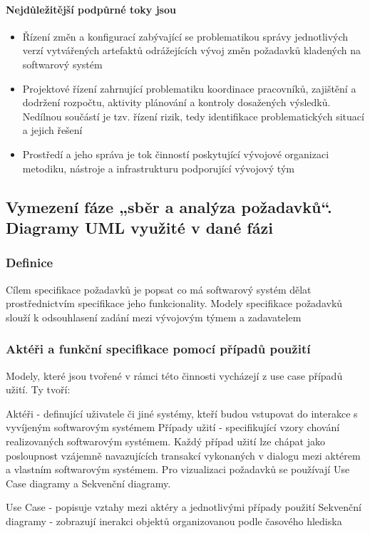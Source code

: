 \documentclass[10pt,a4paper]{article}
\begin{document}
\paragraph{Nejdůležitější podpůrné toky jsou}

\begin{itemize}
\item Řízení změn a konfigurací zabývající se problematikou správy jednotlivých verzí vytvářených artefaktů odrážejících vývoj změn požadavků kladených na softwarový systém
\item Projektové řízení zahrnující problematiku koordinace pracovníků, zajištění a dodržení rozpočtu, aktivity plánování a kontroly dosažených výsledků. Nedílnou součástí je tzv. řízení rizik, tedy identifikace problematických situací a jejich řešení
\item Prostředí a jeho správa je tok činností poskytující vývojové organizaci metodiku, nástroje a infrastrukturu podporující vývojový tým
\end{itemize}

\subsection{Vymezení fáze „sběr a analýza požadavků“. Diagramy UML využité v dané fázi}
\subsubsection{Definice}
Cílem specifikace požadavků je popsat co má softwarový systém dělat prostřednictvím specifikace jeho funkcionality. Modely specifikace požadavků slouží k odsouhlasení zadání mezi vývojovým týmem a zadavatelem
\subsubsection{Aktéři a funkční specifikace pomocí případů použití}
Modely, které jsou tvořené v rámci této činnosti vycházejí z use case případů užití. Ty tvoří:

Aktéři - definující uživatele či jiné systémy, kteří budou vstupovat do interakce s vyvíjeným softwarovým systémem
Případy užití - specifikující vzory chování realizovaných softwarovým systémem. Každý případ užití lze chápat jako posloupnost vzájemně navazujících transakcí vykonaných v dialogu mezi aktérem a vlastním softwarovým systémem.
Pro vizualizaci požadavků se používají Use Case diagramy a Sekvenční diagramy.

Use Case - popisuje vztahy mezi aktéry a jednotlivými případy použití
Sekvenční diagramy - zobrazují inerakci objektů organizovanou podle časového hlediska
\end{document}
